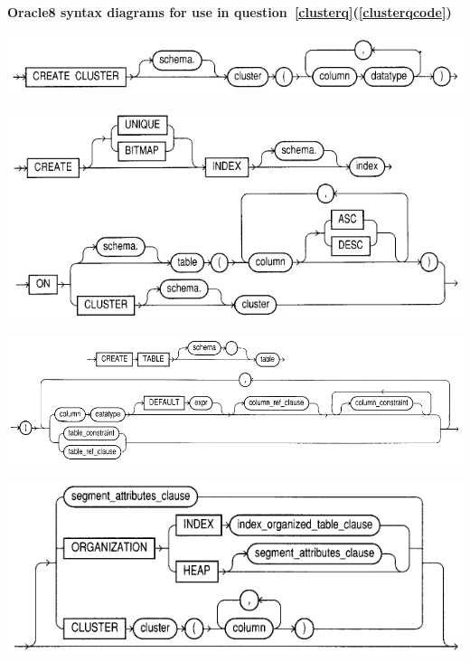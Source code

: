 \documentclass[markingschedule]{ouexam}
\begin{document}
\begin{center}
	\textbf{Oracle8 syntax diagrams for use in
	question~\ref{clusterq}(\ref{clusterqcode})}
	
	\bigskip

	\includegraphics{CreateCluster}

	\vfill


	\includegraphics{CreateIndex}


	\vfill

	\includegraphics{CreateTable1}
	
	\bigskip	
	
	\includegraphics{CreateTable2}
\end{center}
\end{document}
